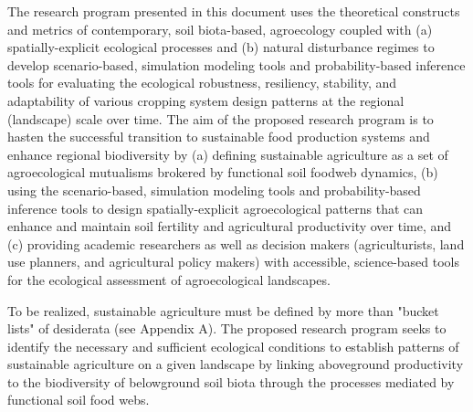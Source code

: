 The research program presented in this document uses the theoretical constructs and metrics of contemporary, soil biota-based, agroecology coupled with (a) spatially-explicit ecological processes and (b) natural disturbance regimes to develop scenario-based, simulation modeling tools and probability-based inference tools for evaluating the ecological robustness, resiliency, stability, and adaptability of various cropping system design patterns at the regional (landscape) scale over time. The aim of the proposed research program is to hasten the successful transition to sustainable food production systems and enhance regional biodiversity by (a) defining sustainable agriculture as a set of agroecological mutualisms brokered by functional soil foodweb dynamics, (b) using the scenario-based, simulation modeling tools and probability-based inference tools to design spatially-explicit agroecological patterns that can enhance and maintain soil fertility and agricultural productivity over time, and (c) providing academic researchers as well as decision makers (agriculturists, land use planners, and agricultural policy makers) with accessible, science-based tools for the ecological assessment of agroecological landscapes. 

To be realized, sustainable agriculture must be defined by more than "bucket lists" of desiderata (see Appendix A). The proposed research program seeks to identify the necessary and sufficient ecological conditions to establish patterns of sustainable agriculture on a given landscape by linking aboveground productivity to the biodiversity of belowground  soil biota through the processes mediated by functional soil food webs. 

